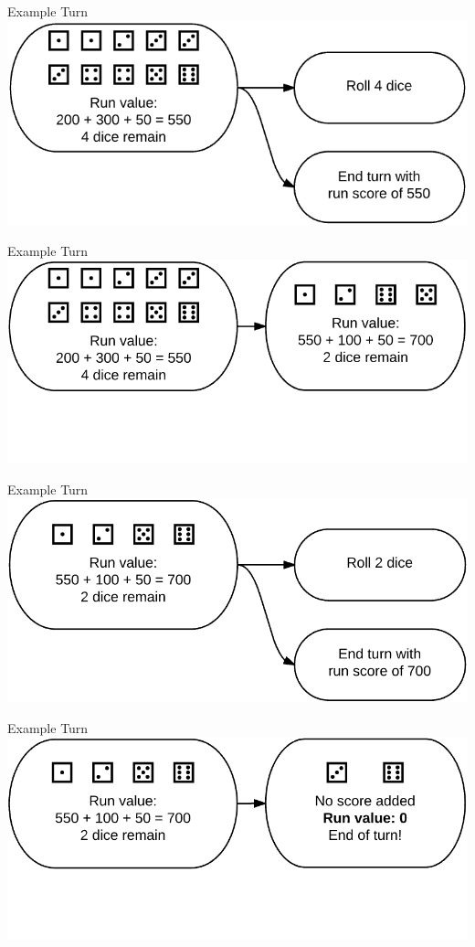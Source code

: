 \documentclass{beamer}
\begin{document}
  \begin{frame}{Example Turn}
  \centering
  \includegraphics[width = \textwidth]{turn1_2.png}
  \end{frame}

  \begin{frame}{Example Turn}
  \centering
  \includegraphics[width = \textwidth]{turn1_3.png}
  \end{frame}

  \begin{frame}{Example Turn}
  \centering
  \includegraphics[width = \textwidth]{turn1_4.png}
  \end{frame}

  \begin{frame}{Example Turn}
  \centering
  \includegraphics[width = \textwidth]{turn1_5.png}
  \end{frame}
\end{document}
